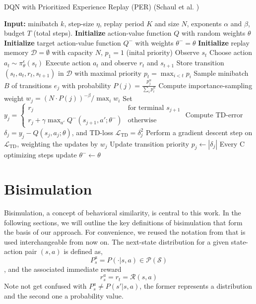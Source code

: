 \begin{algorithm}[h]
\caption{DQN with Prioritized Experience Replay (PER) (Schaul et al. \cite{schaul2015prioritized})}
\label{algorithm:dqn_per}
\begin{algorithmic}[1]
\State \textbf{Input:} minibatch $k$, step-size $\eta$, replay period $K$ and size $N$, exponents $\alpha$ and $\beta$, budget $T$ (total steps).
\State \textbf{Initialize} action-value function $Q$ with random weights $\theta$
\State \textbf{Initialize} target action-value function $Q^-$ with weights $\theta^- = \theta$
\State \textbf{Initialize} replay memory $\mathcal{D} = \emptyset$ with capacity $N$, $p_1 = 1$ (inital priority) %
    \State Observe $s_t$
    \State Choose action $a_t \sim \pi^\epsilon_\theta(s_t)$
    \State Execute action $a_t$ and observe $r_t$ and $s_{t+1}$
    \State Store transition $(s_t, a_t, r_t, s_{t+1})$ in $\mathcal{D}$ with maximal priority $p_t = \max_{i < t} p_i$
        \State Sample minibatch $B$ of transitions $e_j$ with probability $P(j) = \frac{p_j^\alpha}{\sum_i p_i^\alpha}$    
        \State Compute importance-sampling weight $w_j = \left( N \cdot P(j) \right)^{-\beta} / \max_i w_i$
        \State Set $y_j = 
        \begin{cases} 
            r_j & \text{for terminal } s_{j+1}\\
            r_j + \gamma \max_{a'} Q^-(s_{j+1}, a'; \theta^-) & \text{otherwise}
        \end{cases}$
        \State Compute TD-error $\delta_j = y_j - Q(s_{j}, a_{j}; \theta)$, and TD-loss $\mathcal{L}_{\text{TD}} = \delta_j^2 $
        \State Perform a gradient descent step on $\mathcal{L}_{\text{TD}}$, weighting the updates by $w_j$
        \State Update transition priority $p_j \leftarrow |\delta_j|$
        \State Every C optimizing steps update $\theta^- \leftarrow \theta$
    \EndIf
\EndFor
\end{algorithmic}
\end{algorithm}



\section{Bisimulation}
\label{sec:bisimulation_background}

Bisimulation, a concept of behavioral similarity, is central to this work. In the following sections, we will outline the key definitions of bisimulation that form the basis of our approach. For convenience, we reused the notation from \cite{castro2021mico} that is used interchangeable from now on. The next-state distribution for a given state-action pair $(s, a)$ is defined as,
$$P^a_s = P(\cdot|s, a) \in \mathcal{P(S)}$$, and the associated immediate reward 
$$r^a_s = r_t = \mathcal{R}(s,a)$$ 
Note not get confused with $P^a_s \neq P(s'|s, a)$, the former represents a distribution and the second one a probability value.

